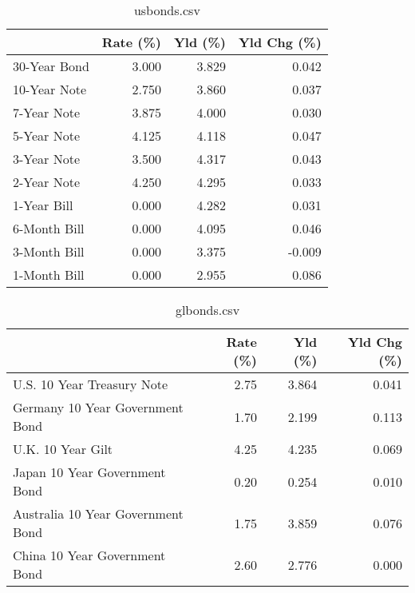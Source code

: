 \documentclass{article}%
\begin{document}
%


\begin{table}[htbp]%
\caption{usbonds.csv}%
\centering%
\begin{adjustbox}{width=1\textwidth}%
\begin{tabular}{lrrr}
\toprule
             &  Rate (\%) &  Yld (\%) &  Yld Chg (\%) \\
\midrule
30-Year Bond &     3.000 &    3.829 &        0.042 \\
10-Year Note &     2.750 &    3.860 &        0.037 \\
 7-Year Note &     3.875 &    4.000 &        0.030 \\
 5-Year Note &     4.125 &    4.118 &        0.047 \\
 3-Year Note &     3.500 &    4.317 &        0.043 \\
 2-Year Note &     4.250 &    4.295 &        0.033 \\
 1-Year Bill &     0.000 &    4.282 &        0.031 \\
6-Month Bill &     0.000 &    4.095 &        0.046 \\
3-Month Bill &     0.000 &    3.375 &       -0.009 \\
1-Month Bill &     0.000 &    2.955 &        0.086 \\
\bottomrule
\end{tabular}
%
\end{adjustbox}%
\end{table}

%


\begin{table}[htbp]%
\caption{glbonds.csv}%
\centering%
\begin{adjustbox}{width=1\textwidth}%
\begin{tabular}{lrrr}
\toprule
                                  &  Rate (\%) &  Yld (\%) &  Yld Chg (\%) \\
\midrule
       U.S. 10 Year Treasury Note &      2.75 &    3.864 &        0.041 \\
  Germany 10 Year Government Bond &      1.70 &    2.199 &        0.113 \\
                U.K. 10 Year Gilt &      4.25 &    4.235 &        0.069 \\
    Japan 10 Year Government Bond &      0.20 &    0.254 &        0.010 \\
Australia 10 Year Government Bond &      1.75 &    3.859 &        0.076 \\
    China 10 Year Government Bond &      2.60 &    2.776 &        0.000 \\
\bottomrule
\end{tabular}
%
\end{adjustbox}%
\end{table}
\end{document}
